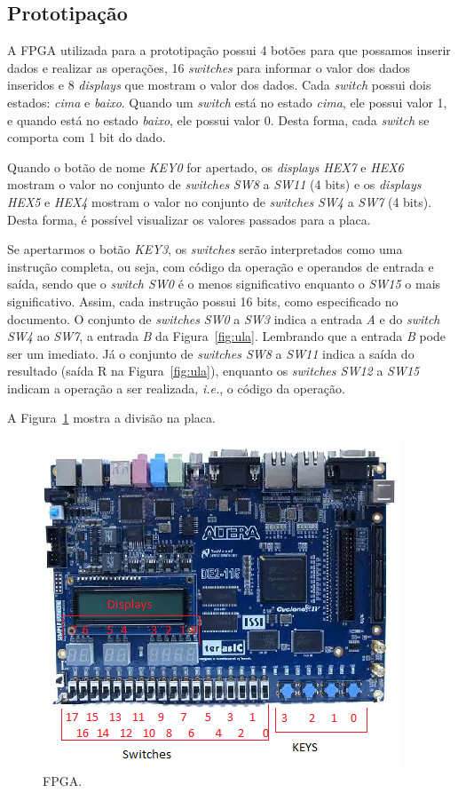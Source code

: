 \documentclass[11pt,a4paper,titlepage]{article}
\begin{document}
\subsection{Prototipação}\label{subsec:prot}

A FPGA utilizada para a prototipação possui 4 botões para que possamos inserir dados e realizar as operações, 16 \textit{switches} para informar o valor dos dados inseridos e 8 \textit{displays} que mostram o valor dos dados.
Cada \textit{switch} possui dois estados: \textit{cima} e \textit{baixo}.
Quando um \textit{switch} está no estado \textit{cima}, ele possui valor 1, e quando está no estado \textit{baixo}, ele possui valor 0.
Desta forma, cada \textit{switch} se comporta com 1 bit do dado.

Quando o botão de nome \textit{KEY0} for apertado, os \textit{displays HEX7} e \textit{HEX6} mostram o valor no conjunto de \textit{switches} \textit{SW8} a \textit{SW11} (4 bits) e os \textit{displays HEX5} e \textit{HEX4} mostram o valor no conjunto de \textit{switches} \textit{SW4} a \textit{SW7} (4 bits).
Desta forma, é possível visualizar os valores passados para a placa.

Se apertarmos o botão \textit{KEY3}, os \textit{switches} serão interpretados como uma instrução completa, ou seja, com código da operação e operandos de entrada e saída, sendo que o \textit{switch SW0} é o menos significativo enquanto o \textit{SW15} o mais significativo.
Assim, cada instrução possui 16 bits, como especificado no documento.
O conjunto de \textit{switches} \textit{SW0} a \textit{SW3} indica a entrada \textit{A} e do \textit{switch SW4} ao \textit{SW7}, a entrada \textit{B} da Figura~\ref{fig:ula}.
Lembrando que a entrada \textit{B} pode ser um imediato.
Já o conjunto de \textit{switches SW8} a \textit{SW11} indica a saída do resultado (saída R na Figura~\ref{fig:ula}), enquanto os \textit{switches SW12} a \textit{SW15} indicam a operação a ser realizada, \textit{i.e.}, o código da operação.

A Figura~\ref{fig:fpga} mostra a divisão na placa.

\begin{figure}[h]
\centering
\includegraphics[]{images/fpga.png}
\caption{FPGA.}
\label{fig:fpga}
\end{figure}
\end{document}
